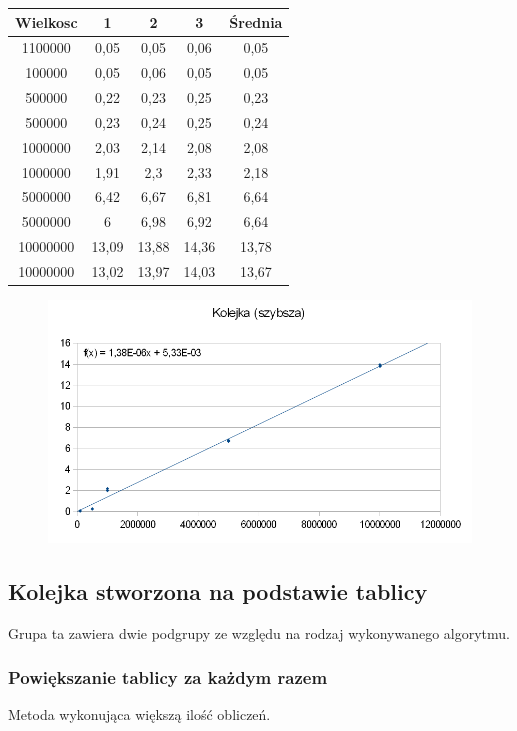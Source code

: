 \documentclass[12pt,a4paper,titlepage]{article}
\begin{document}
\begin{center}
\begin {tabular}{|c|c|c|c|c|}\hline
Wielkosc & 1 & 2 & 3 & Średnia \\\hline
1100000&0,05&0,05&0,06&0,05 \\\hline 
100000&0,05&0,06&0,05&0,05 \\\hline 
500000&0,22&0,23&0,25&0,23 \\\hline 
500000&0,23&0,24&0,25&0,24 \\\hline 
1000000&2,03&2,14&2,08&2,08 \\\hline 
1000000&1,91&2,3&2,33&2,18 \\\hline 
5000000&6,42&6,67&6,81&6,64 \\\hline 
5000000&6&6,98&6,92&6,64 \\\hline 
10000000&13,09&13,88&14,36&13,78 \\\hline 
10000000&13,02&13,97&14,03&13,67 \\\hline 
\end{tabular}
\end {center}
\begin{figure}[h]
\begin{center}
\includegraphics[scale=0.5]{kolejka_2.png}
\end{center}
\end{figure}

\newpage
\subsection{Kolejka stworzona na podstawie tablicy}
Grupa ta zawiera dwie podgrupy ze względu na rodzaj wykonywanego algorytmu.


\subsubsection{Powiększanie tablicy za każdym razem}
Metoda wykonująca większą ilość obliczeń.
\end{document}
